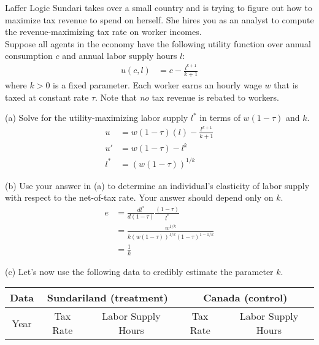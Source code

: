 \documentclass[10pt]{extarticle}
\begin{document}
  \begin{problem}{Laffer Logic}
    Sundari takes over a small country and is trying to figure out how to maximize tax revenue to spend on herself. She hires you as an analyst to compute the revenue-maximizing tax rate on worker incomes.\\

    Suppose all agents in the economy have the following utility function over annual consumption $c$ and annual labor supply hours $l$:
    \begin{align*}
      u(c,l) &= c - \frac{l^{k+1}}{k+1}
    \end{align*}
    where $k > 0$ is a fixed parameter. Each worker earns an hourly wage $w$ that is taxed at constant rate $\tau$. Note that \textit{no} tax revenue is rebated to workers.
    \begin{problem}{(a)}
      Solve for the utility-maximizing labor supply $l^{\ast}$ in terms of $w(1-\tau)$ and $k$.
      \tcblower
      \begin{align*}
        u &= w(1-\tau)(l) - \frac{l^{k+1}}{k+1}\\
        u' &= w(1-\tau) - l^k\\
        l^{\ast} &= \left(w(1-\tau)\right)^{1/k}
      \end{align*}
    \end{problem}
    \begin{problem}{(b)}
      Use your answer in (a) to determine an individual's elasticity of labor supply with respect to the net-of-tax rate. Your answer should depend only on $k$.
      \tcblower
      \begin{align*}
        e &= \frac{dl^{\ast}}{d(1-\tau)}\frac{(1-\tau)}{l^{\ast}}\\
          &= \frac{w^{1/k}}{k\left(w(1-\tau)\right)^{1/k}(1-\tau)^{1-1/k}}\\
          &= \frac{1}{k}
      \end{align*}
    \end{problem}
    \begin{problem}{(c)}
      Let's now use the following data to credibly estimate the parameter $k$.
      \begin{center}
        \renewcommand{\arraystretch}{1.5}
        \begin{tabular}{c|cc|cc}
          \hline
          Data &\multicolumn{2}{c}{Sundariland (treatment)} & \multicolumn{2}{c}{Canada (control)}\\
          \hline
          Year & Tax Rate & Labor Supply Hours & Tax Rate & Labor Supply Hours\\

\end{tabular}
\end{center}
\end{problem}
\end{problem}
\end{document}
